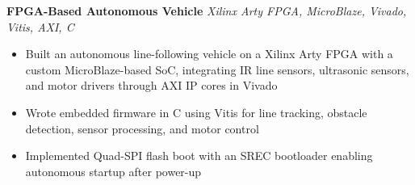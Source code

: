 \documentclass[letterpaper,10pt]{article}
\newenvironment{resumeitems}{\begin{itemize}}{\end{itemize}}
\newcommand{\SecondProjectTitle}{FPGA-Based Autonomous Vehicle}
\newcommand{\SecondProjectContext}{Xilinx Arty FPGA, MicroBlaze, Vivado, Vitis, AXI, C}
\newcommand{\SecondProjectBulletOne}{Built an autonomous line-following vehicle on a Xilinx Arty FPGA with a custom MicroBlaze-based SoC, integrating IR line sensors, ultrasonic sensors, and motor drivers through AXI IP cores in Vivado}
\newcommand{\SecondProjectBulletTwo}{Wrote embedded firmware in C using Vitis for line tracking, obstacle detection, sensor processing, and motor control}
\newcommand{\SecondProjectBulletThree}{Implemented Quad-SPI flash boot with an SREC bootloader enabling autonomous startup after power-up}
\begin{document}
\textbf{\SecondProjectTitle} \hfill \textit{\SecondProjectContext}
\begin{resumeitems}
\item \SecondProjectBulletOne
\item \SecondProjectBulletTwo
\item \SecondProjectBulletThree
\end{resumeitems}
\end{document}
